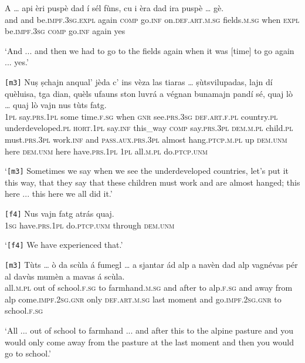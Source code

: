 \begin{linenumbers}
	\gll A … api èri puspè dad í sél fùns, cu i èra dad ira puspè … gè.\\
	and {} and be.\textsc{impf.3sg.expl} again \textsc{comp} go.\textsc{inf} on.\textsc{def.art.m.sg} fields.\textsc{m.sg} when \textsc{expl} be.\textsc{impf.3sg} \textsc{comp} go.\textsc{inf} again {} yes\\
\end{linenumbers}
\medskip
\glt `And ... and then we had to go to the fields again when it was [time] to go again ... yes.'
\medskip

\begin{linenumbers}
	\gll \texttt{[m3]} Nuṣ ṣchajn anqual’ jèda c’ ins vèza las tiaras … ṣùtsvilupadas, lajn dí quèluisa, tga dian, quèls ufauns ston luvrá a végnan bunamajn pandí sé, quaj lò … quaj lò vajn nus tùts fatg.\\
{} \textsc{1pl} say.\textsc{prs.1pl} some time.\textsc{f.sg} when \textsc{gnr} see.\textsc{prs.3sg} \textsc{def.art.f.pl} country.\textsc{pl} {} underdeveloped.\textsc{pl} \textsc{hort.1pl} say.\textsc{inf} this\_way \textsc{comp} say.\textsc{prs.3pl} \textsc{dem.m.pl} child.\textsc{pl} must.\textsc{prs.3pl} work.\textsc{inf} and \textsc{pass.aux.prs.3pl} almost hang.\textsc{ptcp.m.pl} up \textsc{dem.unm} here {} \textsc{dem.unm} here have.\textsc{prs.1pl} \textsc{1pl} all.\textsc{m.pl} do.\textsc{ptcp.unm}	\\
\end{linenumbers}
\medskip
\glt `\texttt{[m3]} Sometimes we say when we see the underdeveloped countries, let's put it this way, that they say that these children must work and are almost hanged; this here ... this here we all did it.'
\medskip

\begin{linenumbers}
	\gll \texttt{[f4]} Nus vajn fatg atrás quaj.\\
	{} \textsc{1sg} have.\textsc{prs.1pl} do\textsc{.ptcp.unm} through \textsc{dem.unm}\\
\end{linenumbers}
\medskip
\glt `\texttt{[f4]} We have experienced that.'
\medskip

\begin{linenumbers}
	\gll  \texttt{[m3]} Tùts … ò da scùla á fumegl … a sjantar ád alp a navèn dad alp vagnévas pér al davùs mumèn a mavas á scùla. \\
{}	all.\textsc{m.pl} {} out of school.\textsc{f.sg} to farmhand.\textsc{m.sg} {} and after to alp.\textsc{f.sg} and away from alp come.\textsc{impf.2sg.gnr} only \textsc{def.art.m.sg} last moment and go.\textsc{impf.2sg.gnr} to school.\textsc{f.sg}\\
\end{linenumbers}
\medskip
\glt `All ... out of school to farmhand ... and after this to the alpine pasture and you would only come away from the pasture at the last moment and then you would go to school.'
\medskip

